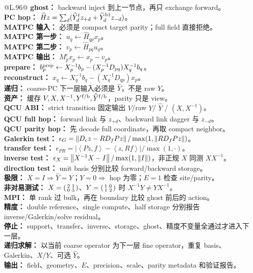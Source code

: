 \documentclass[UTF8,a4paper,11pt]{ctexart}
\newcommand{\ip}[2]{\left\langle#1,#2\right\rangle}
\newcommand{\Yhat}{\widehat Y}\newcommand{\src}[1]{\par\smallskip\noindent\textit{参考源：}#1\par\smallskip}
\begin{document}
\begin{longtable}{@{}L{.96\textwidth}@{}}
\textbf{ghost：} backward inject 到上一节点，再只 exchange forward。\\
\textbf{PC hop：} $\widehat Hz=\sum_d(\Yhat_d^{\rm f}z_{+d}+\Yhat_d^{\rm b\dagger}z_{-d})$。\\
\textbf{MATPC 输入：} 必须是 compact target parity；full field 直接拒绝。\\
\textbf{MATPC 第一步：} $u_q\leftarrow\widehat H_{qp}x_p$。\\
\textbf{MATPC 第二步：} $v_p\leftarrow\widehat H_{pq}u_q$。\\
\textbf{MATPC 输出：} $M_p^cx_p\leftarrow x_p-v_p$。\\
\textbf{prepare：} $b_p^{\rm prep}\leftarrow X_p^{-1}b_p-(X_p^{-1}D_{pq})X_q^{-1}b_q$。\\
\textbf{reconstruct：} $x_q\leftarrow X_q^{-1}b_q-(X_q^{-1}D_{qp})x_p$。\\
\textbf{递归：} coarse-PC 下一层输入必须是 $\Yhat$，不是 raw $Y$。\\
\textbf{资产：} 缓存 $V,X,X^{-1},Y^{\rm f/b},\Yhat^{\rm f/b}$，parity 只是 view。\\
\textbf{QCU ABI：} strict transition 固定输出 $V$/raw $Y$/ $\Yhat$ / $(X,X^{-1})$。\\
\textbf{QCU full hop：} forward link 与 $z_{+d}$、backward link dagger 与 $z_{-d}$。\\
\textbf{QCU parity hop：} 先 decode full coordinate，再取 compact neighbor。\\
\textbf{Galerkin test：} $\epsilon_G=\left\lVert D_cz-RD_fPz\right\rVert/\max(1,\left\lVert RD_fPz\right\rVert)$。\\
\textbf{transfer test：} $\epsilon_{PR}=|\ip{Pz}{f}-\ip{z}{Rf}|/\max(1,\cdot)$。\\
\textbf{inverse test：} $\epsilon_X=\left\lVert X^{-1}X-I\right\rVert/\max(1,\left\lVert I\right\rVert)$，非正规 $X$ 同测 $XX^{-1}$。\\
\textbf{direction test：} unit basis 分别比较 forward/backward storage。\\
\textbf{极限：} $X=I\Rightarrow\Yhat=Y$；$Y=0\Rightarrow$ hop 为零；$E=1$ 检查 site/parity。\\
\textbf{非对易测试：} $X=\begin{psmallmatrix}2&1\\0&3\end{psmallmatrix}$、$Y=\begin{psmallmatrix}1&0\\1&2\end{psmallmatrix}$ 时 $X^{-1}Y\ne YX^{-1}$。\\
\textbf{MPI：} 单 rank 过 bulk，再在 boundary 比较 ghost 前后的 action。\\
\textbf{精度：} double reference、single compute、half storage 分别报告 inverse/Galerkin/solve residual。\\
\textbf{停止：} support、transfer、inverse、storage、ghost、精度不变量全通过才进入下一层。\\
\textbf{递归求解：} 以当前 coarse operator 为下一层 fine operator，重复 basis、Galerkin、$X/Y$、可选 $\Yhat$。\\
\textbf{输出：} field、geometry、$E$、precision、scale、parity metadata 和验证报告。\\
\end{longtable}
\end{document}
